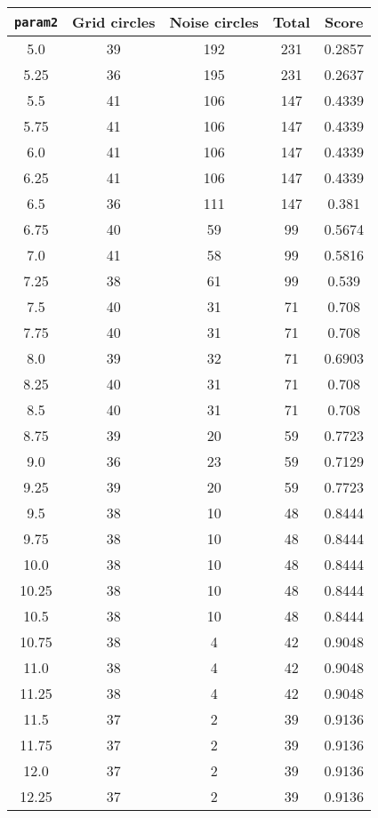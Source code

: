 \documentclass[letterpaper, 12pt]{article}
\begin{document}
\begin{longtable}{|c|c|c|c|c|}
\hline
\textbf{\texttt{param2}} & \textbf{Grid circles} & \textbf{Noise circles} & \textbf{Total} & \textbf{Score} \\
\hline
5.0 & 39 & 192 & 231 & 0.2857 \\
\hline
5.25 & 36 & 195 & 231 & 0.2637 \\
\hline
5.5 & 41 & 106 & 147 & 0.4339 \\
\hline
5.75 & 41 & 106 & 147 & 0.4339 \\
\hline
6.0 & 41 & 106 & 147 & 0.4339 \\
\hline
6.25 & 41 & 106 & 147 & 0.4339 \\
\hline
6.5 & 36 & 111 & 147 & 0.381 \\
\hline
6.75 & 40 & 59 & 99 & 0.5674 \\
\hline
7.0 & 41 & 58 & 99 & 0.5816 \\
\hline
7.25 & 38 & 61 & 99 & 0.539 \\
\hline
7.5 & 40 & 31 & 71 & 0.708 \\
\hline
7.75 & 40 & 31 & 71 & 0.708 \\
\hline
8.0 & 39 & 32 & 71 & 0.6903 \\
\hline
8.25 & 40 & 31 & 71 & 0.708 \\
\hline
8.5 & 40 & 31 & 71 & 0.708 \\
\hline
8.75 & 39 & 20 & 59 & 0.7723 \\
\hline
9.0 & 36 & 23 & 59 & 0.7129 \\
\hline
9.25 & 39 & 20 & 59 & 0.7723 \\
\hline
9.5 & 38 & 10 & 48 & 0.8444 \\
\hline
9.75 & 38 & 10 & 48 & 0.8444 \\
\hline
10.0 & 38 & 10 & 48 & 0.8444 \\
\hline
10.25 & 38 & 10 & 48 & 0.8444 \\
\hline
10.5 & 38 & 10 & 48 & 0.8444 \\
\hline
10.75 & 38 & 4 & 42 & 0.9048 \\
\hline
11.0 & 38 & 4 & 42 & 0.9048 \\
\hline
11.25 & 38 & 4 & 42 & 0.9048 \\
\hline
11.5 & 37 & 2 & 39 & 0.9136 \\
\hline
11.75 & 37 & 2 & 39 & 0.9136 \\
\hline
12.0 & 37 & 2 & 39 & 0.9136 \\
\hline
12.25 & 37 & 2 & 39 & 0.9136 \\
\hline

\end{longtable}
\end{document}
